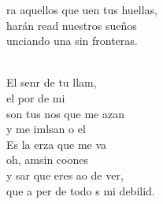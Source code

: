 \begin{cancion}
	ra aquellos que uen tus huellas,\\
	harán read nuestros sueños\\
	unciando una sin fronteras.\\\jump\\
	\begin{chorus}%
	El senr de tu llam,\\
	el por de mi\\
	son tus nos que me azan\\
	y me imlsan o el \\
	Es la erza que me va\\
	oh,  amsin coones\\
	y sar que eres ao de ver,\\
	que a per de todo s mi debilid.\\
	\end{chorus}%
	\jump\\
\end{cancion}%
